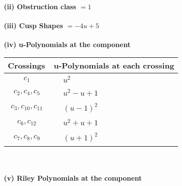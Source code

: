 \documentclass[1p]{elsarticle_modified}
\theoremstyle{definition}
\begin{document}
\flushleft \textbf{(ii) Obstruction class $= 1$}\\~\\
\flushleft \textbf{(iii) Cusp Shapes $= -4 u+5$}\\~\\
\newpage\renewcommand{\arraystretch}{1}
\flushleft \textbf{(iv) u-Polynomials at the component}\newline \\
\begin{tabular}{m{50pt}|m{274pt}}
Crossings & \hspace{64pt}u-Polynomials at each crossing \\
\hline $$\begin{aligned}c_{1}\end{aligned}$$&$\begin{aligned}
&u^2
\end{aligned}$\\
\hline $$\begin{aligned}c_{2},c_{4},c_{5}\end{aligned}$$&$\begin{aligned}
&u^2- u+1
\end{aligned}$\\
\hline $$\begin{aligned}c_{3},c_{10},c_{11}\end{aligned}$$&$\begin{aligned}
&(u-1)^2
\end{aligned}$\\
\hline $$\begin{aligned}c_{6},c_{12}\end{aligned}$$&$\begin{aligned}
&u^2+u+1
\end{aligned}$\\
\hline $$\begin{aligned}c_{7},c_{8},c_{9}\end{aligned}$$&$\begin{aligned}
&(u+1)^2
\end{aligned}$\\
\hline
\end{tabular}\\~\\
\newpage\renewcommand{\arraystretch}{1}
\flushleft \textbf{(v) Riley Polynomials at the component}\newline \\
\end{document}
